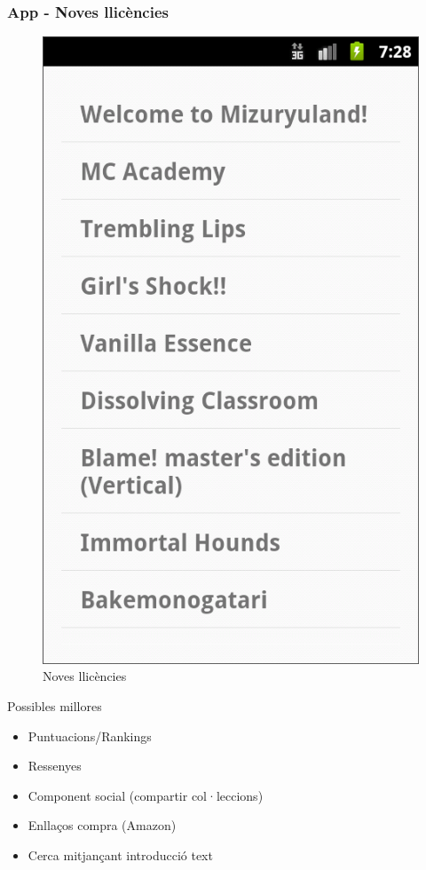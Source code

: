 \documentclass{beamer}
\begin{document}
	\begin{frame}
	\frametitle{App - Noves llicències}
		\begin{figure}
			\centering
			\includegraphics[scale=0.23]{app_new_licenses.png}
			\caption{Noves llicències}
		\end{figure}
	\end{frame}

	\begin{frame}{Possibles millores}
		\begin{itemize}
			\item Puntuacions/Rankings
			\item Ressenyes
			\item Component social (compartir col·leccions)
			\item Enllaços compra (Amazon)
			\item Cerca mitjançant introducció text
		\end{itemize}
	\end{frame}
\end{document}
